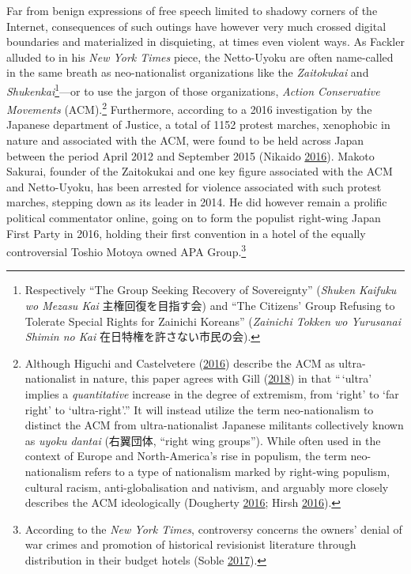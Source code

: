 \documentclass[10pt,british,A4paper,,openany]{memoir}
\begin{document}
Far from benign expressions of free speech limited to shadowy corners of
the Internet, consequences of such outings have however very much
crossed digital boundaries and materialized in disquieting, at times
even violent ways. As Fackler alluded to in his \emph{New York Times}
piece, the Netto-Uyoku are often name-called in the same breath as
neo-nationalist organizations like the \emph{Zaitokukai} and
\emph{Shukenkai}\footnote{Respectively ``The Group Seeking Recovery of
  Sovereignty'' (\emph{Shuken Kaifuku wo Mezasu Kai} 主権回復を目指す会)
  and ``The Citizens' Group Refusing to Tolerate Special Rights for
  Zainichi Koreans'' (\emph{Zainichi Tokken wo Yurusanai Shimin no Kai}
  在日特権を許さない市民の会).}---or to use the jargon of those
organizations, \emph{Action Conservative Movements} (ACM).\footnote{Although
  Higuchi and Castelvetere
  (\protect\hyperlink{ref-higuchi_japans_2016}{2016}) describe the ACM
  as ultra-nationalist in nature, this paper agrees with Gill
  (\protect\hyperlink{ref-gill_nativist_2018}{2018}) in that ``\,`ultra'
  implies a \emph{quantitative} increase in the degree of extremism,
  from `right' to `far right' to `ultra-right'.'' It will instead
  utilize the term neo-nationalism to distinct the ACM from
  ultra-nationalist Japanese militants collectively known as \emph{uyoku
  dantai} (右翼団体, ``right wing groups''). While often used in the
  context of Europe and North-America's rise in populism, the term
  neo-nationalism refers to a type of nationalism marked by right-wing
  populism, cultural racism, anti-globalisation and nativism, and
  arguably more closely describes the ACM ideologically (Dougherty
  \protect\hyperlink{ref-dougherty_new_2016}{2016}; Hirsh
  \protect\hyperlink{ref-hirsh_why_2016}{2016}).} Furthermore, according
to a 2016 investigation by the Japanese department of Justice, a total
of 1152 protest marches, xenophobic in nature and associated with the
ACM, were found to be held across Japan between the period April 2012
and September 2015 (Nikaido
\protect\hyperlink{ref-nikaido_eng:_2016}{2016}). Makoto Sakurai,
founder of the Zaitokukai and one key figure associated with the ACM and
Netto-Uyoku, has been arrested for violence associated with such protest
marches, stepping down as its leader in 2014. He did however remain a
prolific political commentator online, going on to form the populist
right-wing Japan First Party in 2016, holding their first convention in
a hotel of the equally controversial Toshio Motoya owned APA
Group.\footnote{According to the \emph{New York Times}, controversy
  concerns the owners' denial of war crimes and promotion of historical
  revisionist literature through distribution in their budget hotels
  (Soble \protect\hyperlink{ref-soble_right-wing_2017}{2017}).}
\end{document}
